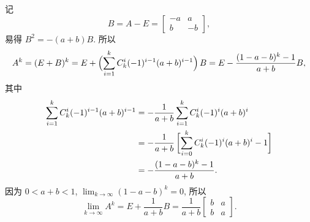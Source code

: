 \begin{solution}
    记
    \[
        B
        = A - E
        = \begin{bmatrix}
            - a & a \\
            b & - b
        \end{bmatrix},
    \]
    易得 $B^2 = -(a + b)B$. 所以
    \[
        A^k = (E + B)^k = E + \del[2]{\sum_{i = 1}^k C_k^i (-1)^{i - 1} (a + b)^{i - 1}}B
        = E - \frac{(1-a-b)^k - 1}{a + b} B,
    \]
    其中
    \begin{align*}
        \sum_{i = 1}^k C_k^i (-1)^{i - 1} (a + b)^{i - 1}
        &= -\frac{1}{a + b} \sum_{i = 1}^k C_k^i (-1)^{i} (a + b)^{i} \\
        &= -\frac{1}{a + b} \sbr[3]{\sum_{i = 0}^k C_k^i (-1)^{i} (a + b)^{i} - 1} \\
        &= -\frac{(1-a-b)^k - 1}{a + b}.
    \end{align*}
    因为 $0 < a + b < 1$, $\lim_{k \to \infty} (1 - a - b)^k = 0$, 所以
    \[
        \lim_{k \to \infty} A^k = E + \frac{1}{a + b} B 
        = \frac{1}{a + b} \begin{bmatrix}
            b & a \\
            b & a
        \end{bmatrix}.
    \]
\end{solution}